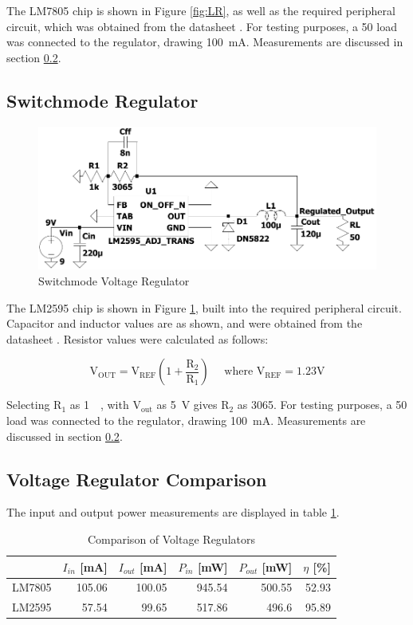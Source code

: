The LM7805 chip is shown in Figure \ref{fig:LR}, as well as the required peripheral circuit, which was obtained from the datasheet \cite{lm7805}. For testing purposes, a \SI{50}{\Omega} load was connected to the regulator, drawing \SI{100}{mA}. Measurements are discussed in section \ref{sec:comp}.


	\subsection{Switchmode Regulator} \label{sec:smreg}
\begin{figure}[h]
    \centering
    \includegraphics[width = 1\textwidth]{Figures/SM.pdf}
    \caption{Switchmode Voltage Regulator}
    \label{fig:SM}
\end{figure}

The LM2595 chip is shown in Figure \ref{fig:SM}, built into the required peripheral circuit. Capacitor and inductor values are as shown, and were obtained from the datasheet \cite{lm2595}. Resistor values were calculated as follows:

$$\mathrm{V}_{\mathrm{OUT}}=\mathrm{V}_{\mathrm{REF}}\left(1+\frac{\mathrm{R}_{2}}{\mathrm{R}_{1}}\right) \quad \text { where } \mathrm{V}_{\mathrm{REF}}=1.23 \mathrm{V}$$

Selecting $\mathrm{R_1}$ as \SI{1}{\kilo\Omega}, with $\mathrm{V_{out}}$ as \SI{5}{\volt} gives $\mathrm{R_2}$ as \SI{3065}{\Omega}. For testing purposes, a \SI{50}{\Omega} load was connected to the regulator, drawing \SI{100}{mA}. Measurements are discussed in section \ref{sec:comp}.


	\subsection{Voltage Regulator Comparison} \label{sec:comp}
The input and output power measurements are displayed in table \ref{tab:compvreg}.
\begin{table}[h]
        \centering
        \footnotesize
        \caption{Comparison of Voltage Regulators}
         \begin{tabular}{c@{\qquad}rrrrr}
          \toprule
             & $I_{in}$ [mA] & $I_{out}$ [mA] & $P_{in}$ [mW] & $P_{out}$ [mW] & $\eta$ [\%] \\
          \midrule
          LM7805 	& 105.06 	& 100.05 	& 945.54 	& 500.55 	& 52.93\\
          LM2595 	& 57.54 	& 99.65 	& 517.86 	& 496.6 	& 95.89\\
          \bottomrule
        \end{tabular}
     \label{tab:compvreg}
\end{table}

